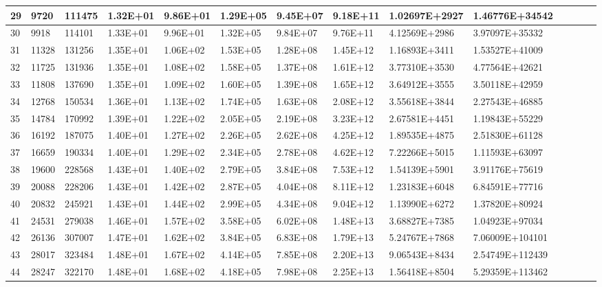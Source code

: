 \documentclass{article}
\begin{document}
\begin{itemize}
\begin{table}[H]
{\begin{tabular}{|l|l|l|l|l|l|l|l|l|l|l|l|l|l|}
    \hline
    29    & 9720  & 111475 & 1.32E+01 & 9.86E+01 & 1.29E+05 & 9.45E+07 & 9.18E+11 & 1.02697E+2927 & 1.46776E+34542 \\
    \hline
    30    & 9918  & 114101 & 1.33E+01 & 9.96E+01 & 1.32E+05 & 9.84E+07 & 9.76E+11 & 4.12569E+2986 & 3.97097E+35332 \\
    \hline
    31    & 11328 & 131256 & 1.35E+01 & 1.06E+02 & 1.53E+05 & 1.28E+08 & 1.45E+12 & 1.16893E+3411 & 1.53527E+41009 \\
    \hline
    32    & 11725 & 131936 & 1.35E+01 & 1.08E+02 & 1.58E+05 & 1.37E+08 & 1.61E+12 & 3.77310E+3530 & 4.77564E+42621 \\
    \hline
    33    & 11808 & 137690 & 1.35E+01 & 1.09E+02 & 1.60E+05 & 1.39E+08 & 1.65E+12 & 3.64912E+3555 & 3.50118E+42959 \\
    \hline
    34    & 12768 & 150534 & 1.36E+01 & 1.13E+02 & 1.74E+05 & 1.63E+08 & 2.08E+12 & 3.55618E+3844 & 2.27543E+46885 \\
    \hline
    35    & 14784 & 170992 & 1.39E+01 & 1.22E+02 & 2.05E+05 & 2.19E+08 & 3.23E+12 & 2.67581E+4451 & 1.19843E+55229 \\
    \hline
    36    & 16192 & 187075 & 1.40E+01 & 1.27E+02 & 2.26E+05 & 2.62E+08 & 4.25E+12 & 1.89535E+4875 & 2.51830E+61128 \\
    \hline
    37    & 16659 & 190334 & 1.40E+01 & 1.29E+02 & 2.34E+05 & 2.78E+08 & 4.62E+12 & 7.22266E+5015 & 1.11593E+63097 \\
    \hline
    38    & 19600 & 228568 & 1.43E+01 & 1.40E+02 & 2.79E+05 & 3.84E+08 & 7.53E+12 & 1.54139E+5901 & 3.91176E+75619 \\
    \hline
    39    & 20088 & 228206 & 1.43E+01 & 1.42E+02 & 2.87E+05 & 4.04E+08 & 8.11E+12 & 1.23183E+6048 & 6.84591E+77716 \\
    \hline
    40    & 20832 & 245921 & 1.43E+01 & 1.44E+02 & 2.99E+05 & 4.34E+08 & 9.04E+12 & 1.13990E+6272 & 1.37820E+80924 \\
    \hline
    41    & 24531 & 279038 & 1.46E+01 & 1.57E+02 & 3.58E+05 & 6.02E+08 & 1.48E+13 & 3.68827E+7385 & 1.04923E+97034 \\
    \hline
    42    & 26136 & 307007 & 1.47E+01 & 1.62E+02 & 3.84E+05 & 6.83E+08 & 1.79E+13 & 5.24767E+7868 & 7.06009E+104101 
    \\
    \hline
    43    & 28017 & 323484 & 1.48E+01 & 1.67E+02 & 4.14E+05 & 7.85E+08 & 2.20E+13 & 9.06543E+8434 & 2.54749E+112439 \\
    \hline
    44    & 28247 & 322170 & 1.48E+01 & 1.68E+02 & 4.18E+05 & 7.98E+08 & 2.25E+13 & 1.56418E+8504 & 5.29359E+113462 \\

\end{tabular}}
\end{table}
\end{itemize}
\end{document}
